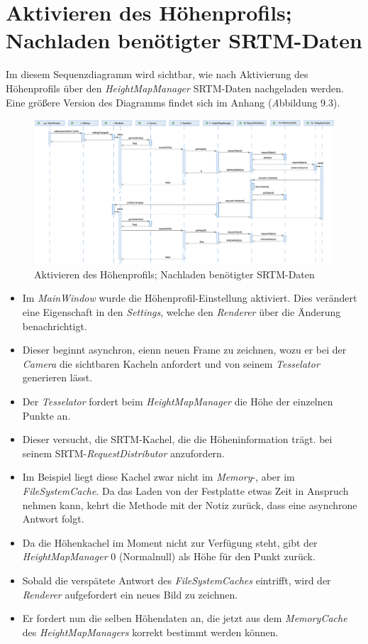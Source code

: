 \documentclass[10pt]{scrreprt}
\newcommand{\textref}[1]{\mbox{\raisebox{0.1ex}{\small$\rightarrow$ }\textit{#1}}}
\begin{document}
\newpage

\section{Aktivieren des Höhenprofils; Nachladen benötigter SRTM-Daten}
Im diesem Sequenzdiagramm wird sichtbar, wie nach Aktivierung des Höhenprofils über den \textit{HeightMapManager} SRTM-Daten nachgeladen werden.
Eine größere Version des Diagramms findet sich im Anhang (\textref Abbildung 9.3).

\vspace*{5mm}
\begin{figure}[h]
\begin{center}
\includegraphics[scale=0.28]{sequenz-height.eps}
\caption{Aktivieren des Höhenprofils; Nachladen benötigter SRTM-Daten}
\end{center}
\end{figure}

\begin{itemize}
\item Im \textit{MainWindow} wurde die Höhenprofil-Einstellung aktiviert. Dies verändert eine Eigenschaft in den \textit{Settings}, welche den \textit{Renderer} über die Änderung benachrichtigt.
\item Dieser beginnt asynchron, eienn neuen Frame zu zeichnen, wozu er bei der \textit{Camera} die sichtbaren Kacheln anfordert und von seinem \textit{Tesselator} generieren lässt.
\item Der \textit{Tesselator} fordert beim \textit{HeightMapManager} die Höhe der einzelnen Punkte an.
\item Dieser versucht, die SRTM-Kachel, die die Höheninformation trägt. bei seinem SRTM-\textit{RequestDistributor} anzufordern.
\item Im Beispiel liegt diese Kachel zwar nicht im \textit{Memory}-, aber im \textit{FileSystemCache}. Da das Laden von der Festplatte etwas Zeit in Anspruch nehmen kann, kehrt die Methode mit der Notiz zurück, dass eine asynchrone Antwort folgt.
\item Da die Höhenkachel im Moment nicht zur Verfügung steht, gibt der \textit{HeightMapManager} 0 (Normalnull) als Höhe für den Punkt zurück.
\item Sobald die verspätete Antwort des \textit{FileSystemCaches} eintrifft, wird der \textit{Renderer} aufgefordert ein neues Bild zu zeichnen.
\item Er fordert nun die selben Höhendaten an, die jetzt aus dem \textit{MemoryCache} des \textit{HeightMapManagers} korrekt bestimmt werden können.
\end{itemize}
\end{document}
